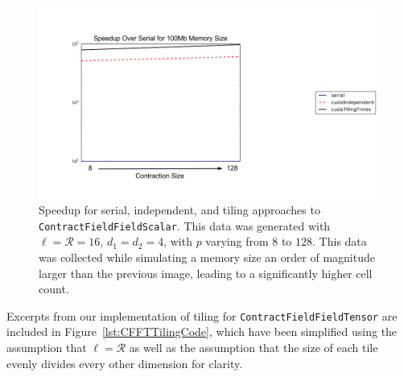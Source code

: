 \begin{figure}[H]
    \centering
\includegraphics[width=5in]{CFFTTiling2}
\caption[\texttt{ContractFieldFieldScalar} tiling (large
memory)]{Speedup for serial, independent, and tiling approaches to
    \texttt{ContractFieldFieldScalar}. This data was generated with
    $\ell=\mathcal{R}=16$, $d_1=d_2=4$, with $p$ varying from $8$ to $128$. This
data was collected while simulating a memory size an order of magnitude larger
than the previous image, leading to a significantly higher cell count. }
\label{fig:multiDTiling2}
\end{figure}

Excerpts from our implementation of tiling for \texttt{ContractFieldFieldTensor} are included in Figure~\ref{lst:CFFTTilingCode}, which have been simplified using the assumption that $\ell=\mathcal{R}$ as well as the assumption that the size of each tile evenly divides every other dimension for clarity. 

